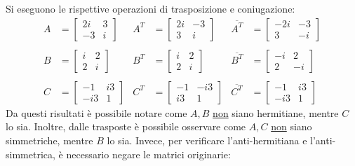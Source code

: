 \documentclass[a4paper]{article}
\begin{document}
	Si eseguono le rispettive operazioni di trasposizione e coniugazione:
	\begin{equation*}
		\begin{array}{lllllllll}
			A & = \begin{bmatrix}
				2i 	& 3		\\
				-3	& i
			\end{bmatrix} &
			A^{T} & = \begin{bmatrix}
				2i	& -3	\\
				3	& i
			\end{bmatrix} &
			\overline{A^{T}} & = \begin{bmatrix}
				-2i	& -3	\\
				3	& -i
			\end{bmatrix} \\
			&&&&& \\
			B & = \begin{bmatrix}
				i 	& 2		\\
				2	& i
			\end{bmatrix} &
			B^{T} & = \begin{bmatrix}
				i	& 2		\\
				2	& i
			\end{bmatrix} &
			\overline{B^{T}} & = \begin{bmatrix}
				-i	& 2		\\
				2	& -i
			\end{bmatrix} \\
			&&&&& \\
			C & = \begin{bmatrix}
				-1 	& i3	\\
				-i3	& 1
			\end{bmatrix} &
			C^{T} & = \begin{bmatrix}
				-1	& -i3	\\
				i3	& 1
			\end{bmatrix} &
			\overline{C^{T}} & = \begin{bmatrix}
				-1	& i3	\\
				-i3	& 1
			\end{bmatrix}
		\end{array}
	\end{equation*}
	Da questi risultati è possibile notare come $A, B$ \underline{non} siano hermitiane, mentre $C$ lo sia. Inoltre, dalle trasposte è possibile osservare come $A, C$ \underline{non} siano simmetriche, mentre $B$ lo sia. Invece, per verificare l'anti-hermitiana e l'anti-simmetrica, è necessario negare le matrici originarie:
\end{document}
